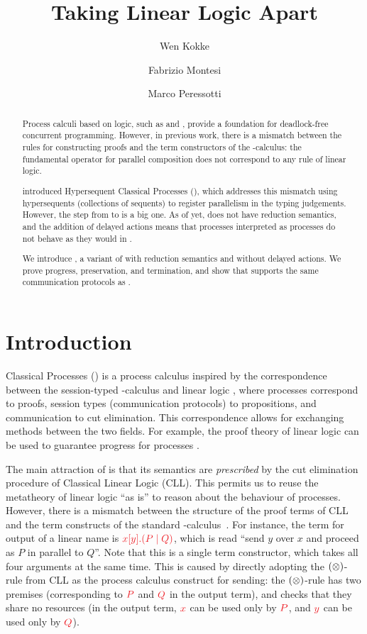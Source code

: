 \documentclass[submission,copyright,creativecommons]{eptcs}
\title{Taking Linear Logic Apart}
\author{%
  Wen Kokke
  \institute{University of Edinburgh\\ Edinburgh, Scotland}
  \email{wen.kokke@ed.ac.uk}
  \and
  Fabrizio Montesi
  \institute{University of Southern Denmark\\ Odense, Denmark}
  \email{fmontesi@imada.sdu.dk}
  \and
  Marco Peressotti
  \institute{University of Southern Denmark\\ Odense, Denmark}
  \email{peressotti@imada.sdu.dk}}
\begin{document}
\maketitle

\begin{abstract}
  Process calculi based on logic, such as \piDILL and \cp, provide a foundation for deadlock-free concurrent programming. However, in previous work, there is a mismatch between the rules for constructing proofs and the term constructors of the \textpi-calculus: the fundamental operator for parallel composition does not correspond to any rule of linear logic.

  \citet{kokke2019} introduced Hypersequent Classical Processes (\dhcp), which addresses this mismatch using hypersequents (collections of sequents) to register parallelism in the typing judgements.
  However, the step from \cp to \dhcp is a big one. As of yet, \dhcp does not have reduction semantics, and the addition of delayed actions means that \cp processes interpreted as \dhcp processes do not behave as they would in \cp.

  We introduce \hcp, a variant of \dhcp with reduction semantics and without delayed actions. We prove progress, preservation, and termination, and show that \hcp supports the same communication protocols as \cp.
\end{abstract}

\section{Introduction}
\label{sec:introduction}

Classical Processes (\cp) \citep{wadler2012} is a process calculus inspired by the correspondence between the session-typed \textpi-calculus and linear logic \citep{caires2010}, where processes correspond to proofs, session types (communication protocols) to propositions, and communication to cut elimination. This correspondence allows for exchanging methods between the two fields. For example, the proof theory of linear logic can be used to guarantee progress for processes \citep{caires2010,wadler2012}.

The main attraction of \cp is that its semantics are \emph{prescribed} by the cut elimination procedure of Classical Linear Logic (CLL). This permits us to reuse the metatheory of linear logic ``as is'' to reason about the behaviour of processes. However, there is a mismatch between the structure of the proof terms of CLL and the term constructs of the standard \textpi-calculus~\citep{milner1992a,milner1992b}. For instance, the term for output of a linear name is $\tm{\cpSend{x}{y}{P}{Q}}$, which is read ``send $y$ over $x$ and proceed as $P$ in parallel to $Q$''. Note that this is a single term constructor, which takes all four arguments at the same time. This is caused by directly adopting the $(\otimes)$-rule from CLL as the process calculus construct for sending: the $(\otimes)$-rule has two premises (corresponding to $\tm P$ and $\tm Q$ in the output term), and checks that they share no resources (in the output term, $\tm x$ can be used only by $\tm P$, and $\tm y$ can be used only by $\tm Q$).
\end{document}
